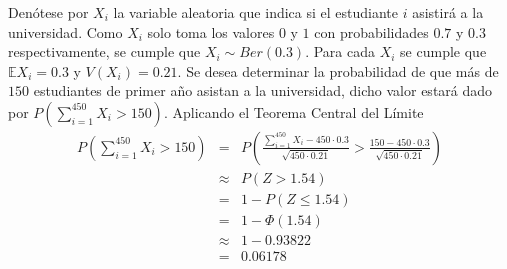 \documentclass[a4paper,11pt]{article}
\begin{document}
\begin{itemize}
\par Den\'otese por $X_i$ la variable aleatoria que indica si el estudiante $i$ asistir\'a a la universidad. Como $X_i$ solo toma los valores $0$ y $1$ con probabilidades $0.7$ y $0.3$ respectivamente, se cumple que $X_i\sim Ber(0.3)$. Para cada $X_i$ se cumple que $\mathbb{E}X_i=0.3$ y $V(X_i)=0.21$. Se desea determinar la probabilidad de que m\'as de $150$ estudiantes de primer a\~no asistan a la universidad, dicho valor estar\'a dado por $P\left(\displaystyle\sum_{i=1}^{450}{X_i}> 150\right)$. Aplicando el Teorema Central del L\'imite
\begin{eqnarray}
P\left(\displaystyle\sum_{i=1}^{450}{X_i}> 150\right)&=&P\left(\frac{\displaystyle\sum_{i=1}^{450}{X_i}-450\cdot 0.3}{\sqrt{450\cdot 0.21}}> \frac{150-450\cdot 0.3}{\sqrt{450\cdot 0.21}}\right)\nonumber\\
&\approx&P\left(Z>1.54\right)\nonumber\\
&=&1-P\left(Z\leq 1.54\right)\nonumber\\
&=&1-\Phi\left(1.54\right)\nonumber\\
&\approx&1-0.93822\nonumber\\
&=&0.06178\nonumber
\end{eqnarray}\\









\end{itemize}
\end{document}
